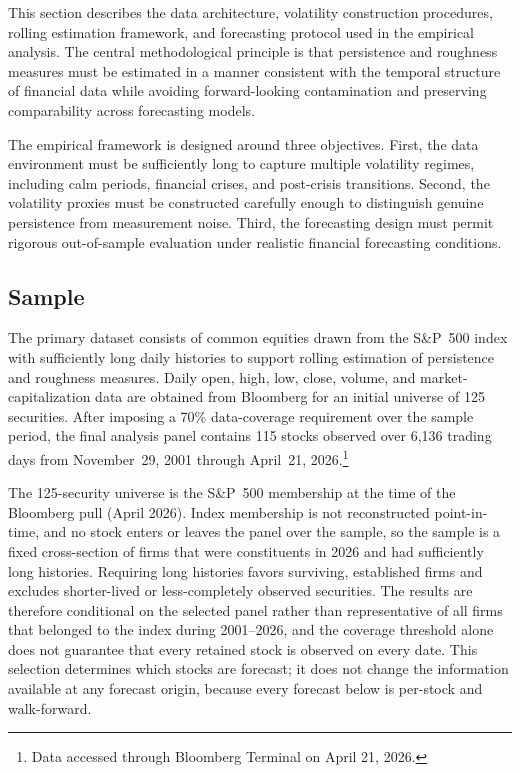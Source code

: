 \documentclass[jrfm,article,submit,moreauthors,pdftex]{Definitions/mdpi}
\begin{document}
This section describes the data architecture, volatility construction
procedures, rolling estimation framework, and forecasting protocol used in
the empirical analysis. The central methodological principle is that
persistence and roughness measures must be estimated in a manner consistent
with the temporal structure of financial data while avoiding forward-looking
contamination and preserving comparability across forecasting models.

The empirical framework is designed around three objectives. First, the
data environment must be sufficiently long to capture multiple volatility
regimes, including calm periods, financial crises, and post-crisis
transitions. Second, the volatility proxies must be constructed carefully
enough to distinguish genuine persistence from measurement noise. Third,
the forecasting design must permit rigorous out-of-sample evaluation under
realistic financial forecasting conditions.

\subsection{Sample}

The primary dataset consists of common equities drawn from the S\&P~500
index with sufficiently long daily histories to support rolling estimation
of persistence and roughness measures. Daily open, high, low, close,
volume, and market-capitalization data are obtained from Bloomberg for an
initial universe of 125 securities. After imposing a 70\% data-coverage
requirement over the sample period, the final analysis panel contains
115 stocks observed over 6,136 trading days from November~29, 2001 through
April~21, 2026.\footnote{Data accessed through Bloomberg Terminal on April 21, 2026.}

The 125-security universe is the S\&P~500 membership at the time of the
Bloomberg pull (April 2026). Index membership is not reconstructed
point-in-time, and no stock enters or leaves the panel over the sample, so
the sample is a fixed cross-section of firms that were constituents in
2026 and had sufficiently long histories. Requiring long histories favors
surviving, established firms and excludes shorter-lived or less-completely
observed securities. The results are therefore conditional on the selected
panel rather than representative of all firms that belonged to the index
during 2001--2026, and the coverage threshold alone does not guarantee that
every retained stock is observed on every date. This selection determines
which stocks are forecast; it does not change the information available at
any forecast origin, because every forecast below is per-stock and
walk-forward.
\end{document}
